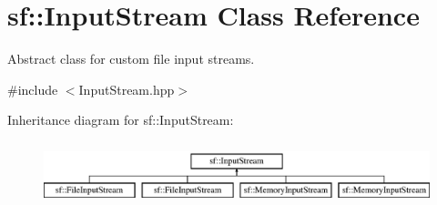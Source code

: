 \hypertarget{classsf_1_1_input_stream}{\section{sf\-:\-:Input\-Stream Class Reference}
\label{classsf_1_1_input_stream}
}


Abstract class for custom file input streams.  




{\ttfamily \#include $<$Input\-Stream.\-hpp$>$}

Inheritance diagram for sf\-:\-:Input\-Stream\-:\begin{figure}[H]
\begin{center}
\leavevmode
\includegraphics[height=1.891892cm]{classsf_1_1_input_stream}
\end{center}
\end{figure}
